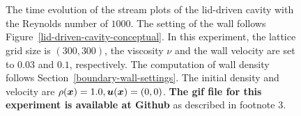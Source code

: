 \begin{figure}[t]
  \begin{center}
    \\
    \vspace{-3mm}
    \\
    \caption{
      The time evolution of the stream plots of the lid-driven cavity
    with the Reynolds number of $1000$.
    The setting of the wall follows Figure~\ref{lid-driven-cavity-conceptual}.
    In this experiment, the lattice grid size is $(300, 300)$,
    the viscosity $\nu$ and the wall velocity are set to $0.03$ and $0.1$, respectively.
    The computation of wall density follows Section~\ref{boundary-wall-settings}.
    The initial density and velocity are $\rho(\boldsymbol{x}) = 1.0, \boldsymbol{u}(\boldsymbol{x}) = (0, 0)$.
    {\bf The gif file for this experiment is available at Github} as described in footnote 3.
    }
    \label{fig:sliding-lid-velocity-evolution}
  \end{center}
\end{figure}


